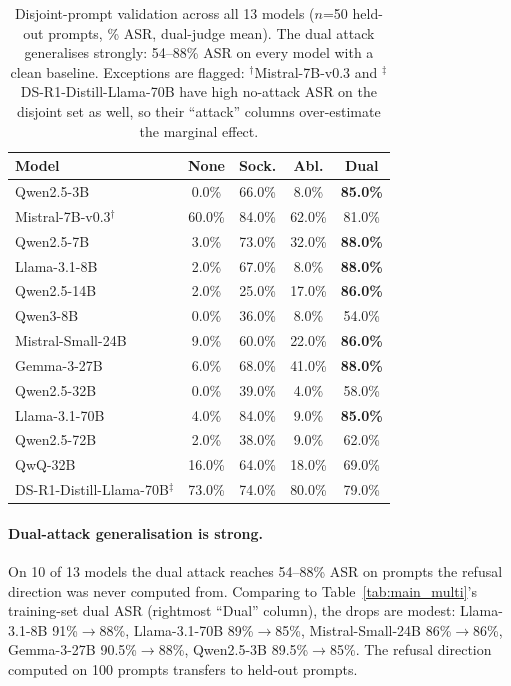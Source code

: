 \documentclass{article}
\begin{document}
\begin{table}[t]
\caption{Disjoint-prompt validation across all 13 models ($n$=50 held-out prompts, \% ASR, dual-judge mean). The dual attack generalises strongly: 54--88\% ASR on every model with a clean baseline. Exceptions are flagged: $^\dagger$Mistral-7B-v0.3 and $^\ddagger$DS-R1-Distill-Llama-70B have high no-attack ASR on the disjoint set as well, so their ``attack'' columns over-estimate the marginal effect.}
\label{tab:disjoint}
\begin{center}
\small
\begin{tabular}{lccc>{\columncolor{ctrlshade}}c}
\toprule
\textbf{Model} & \textbf{None} & \textbf{Sock.} & \textbf{Abl.} & \textbf{Dual} \\
\midrule
Qwen2.5-3B                        & 0.0\%  & 66.0\% & 8.0\%  & \textbf{85.0\%} \\
Mistral-7B-v0.3$^\dagger$          & 60.0\% & 84.0\% & 62.0\% & 81.0\% \\
Qwen2.5-7B                        & 3.0\%  & 73.0\% & 32.0\% & \textbf{88.0\%} \\
Llama-3.1-8B                      & 2.0\%  & 67.0\% & 8.0\%  & \textbf{88.0\%} \\
Qwen2.5-14B                       & 2.0\%  & 25.0\% & 17.0\% & \textbf{86.0\%} \\
Qwen3-8B                          & 0.0\%  & 36.0\% & 8.0\%  & 54.0\% \\
Mistral-Small-24B                 & 9.0\%  & 60.0\% & 22.0\% & \textbf{86.0\%} \\
Gemma-3-27B                       & 6.0\%  & 68.0\% & 41.0\% & \textbf{88.0\%} \\
Qwen2.5-32B                       & 0.0\%  & 39.0\% & 4.0\%  & 58.0\% \\
Llama-3.1-70B                     & 4.0\%  & 84.0\% & 9.0\%  & \textbf{85.0\%} \\
Qwen2.5-72B                       & 2.0\%  & 38.0\% & 9.0\%  & 62.0\% \\
\rowcolor{reasoning} QwQ-32B                           & 16.0\% & 64.0\% & 18.0\% & 69.0\% \\
\rowcolor{reasoning} DS-R1-Distill-Llama-70B$^\ddagger$ & 73.0\% & 74.0\% & 80.0\% & 79.0\% \\
\bottomrule
\end{tabular}
\end{center}
\end{table}

\paragraph{Dual-attack generalisation is strong.}
On 10 of 13 models the dual attack reaches 54--88\% ASR on prompts the refusal direction was never computed from. Comparing to Table~\ref{tab:main_multi}'s training-set dual ASR (rightmost ``Dual'' column), the drops are modest: Llama-3.1-8B 91\%$\rightarrow$88\%, Llama-3.1-70B 89\%$\rightarrow$85\%, Mistral-Small-24B 86\%$\rightarrow$86\%, Gemma-3-27B 90.5\%$\rightarrow$88\%, Qwen2.5-3B 89.5\%$\rightarrow$85\%. The refusal direction computed on 100 prompts transfers to held-out prompts.
\end{document}
